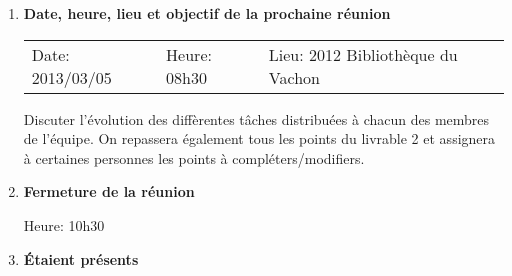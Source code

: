 \documentclass[12pt]{ULojpv}
\begin{document}
\begin{enumerate}
\item \textbf{Date, heure, lieu et objectif de la prochaine réunion}

\begin{tabular}{@{}lll}
   Date: 2013/03/05
   & Heure: 08h30
   &  Lieu: 2012 Bibliothèque du Vachon
\end{tabular}
\par
Discuter l'évolution des diffèrentes tâches distribuées à chacun des membres de l'équipe. On repassera également tous les points du livrable 2 et assignera à certaines personnes les points à compléters/modifiers.


\item \textbf{Fermeture de la réunion}

Heure: 10h30


\item \textbf{Étaient présents}


\end{enumerate}
\end{document}
